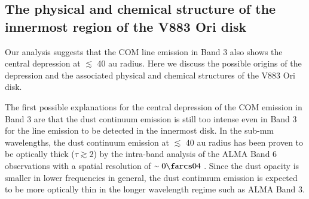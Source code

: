 \documentclass[linenumbers, twocolumn, twocolappendix, astrosymb, times]{aastex631}
\begin{document}

\subsection{The physical and chemical structure of the innermost region of the V883 Ori disk}\label{subsec:physicochemical_structure}
Our analysis suggests that the COM line emission in Band 3 also shows the central depression at $\lesssim$ 40 au radius. Here we discuss the possible origins of the depression and the associated physical and chemical structures of the V883 Ori disk. 


The first possible explanations for the central depression of the COM emission in Band 3 are that the dust continuum emission is still too intense even in Band 3 for the line emission to be detected in the innermost disk. In the sub-mm wavelengths, the dust continuum emission at $\lesssim$ 40 au radius has been proven to be optically thick ($\tau \gtrsim 2$) by the intra-band analysis of the ALMA Band 6 observations with a spatial resolution of $\sim0\farcs04$ \citep{Cieza2016}. Since the dust opacity is smaller in lower frequencies in general, the dust continuum emission is expected to be more optically thin in the longer wavelength regime such as ALMA Band 3. 
\end{document}
